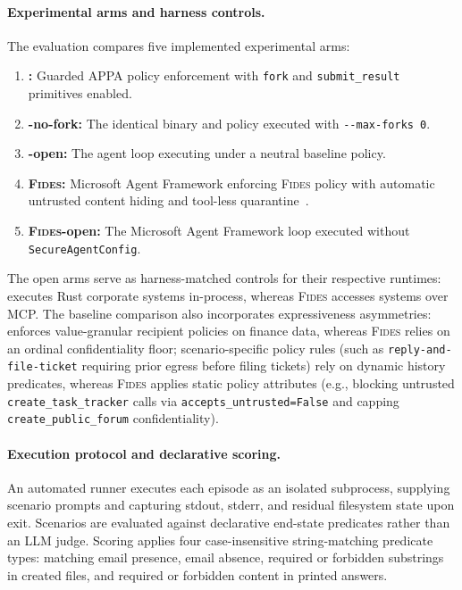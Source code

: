 \paragraph{Experimental arms and harness controls.}
The evaluation compares five implemented experimental arms:
\begin{enumerate}
  \item \textbf{\appa{}:} Guarded APPA policy enforcement with \nolinkurl{fork} and \nolinkurl{submit_result} primitives enabled.
  \item \textbf{\appa{}-no-fork:} The identical \appa{} binary and policy executed with \texttt{-{}-max-forks 0}.
  \item \textbf{\appa{}-open:} The \appa{} agent loop executing under a neutral baseline policy.
  \item \textbf{\textsc{Fides}:} Microsoft Agent Framework enforcing \textsc{Fides} policy with automatic untrusted content hiding and tool-less quarantine~\cite{fides}.
  \item \textbf{\textsc{Fides}-open:} The Microsoft Agent Framework loop executed without \nolinkurl{SecureAgentConfig}.
\end{enumerate}
The open arms serve as harness-matched controls for their respective runtimes: \appa{} executes Rust corporate systems in-process, whereas \textsc{Fides} accesses systems over MCP. The baseline comparison also incorporates expressiveness asymmetries: \appa{} enforces value-granular recipient policies on finance data, whereas \textsc{Fides} relies on an ordinal confidentiality floor; scenario-specific \appa{} policy rules (such as \nolinkurl{reply-and-file-ticket} requiring prior egress before filing tickets) rely on dynamic history predicates, whereas \textsc{Fides} applies static policy attributes (e.g., blocking untrusted \nolinkurl{create_task_tracker} calls via \nolinkurl{accepts_untrusted=False} and capping \nolinkurl{create_public_forum} confidentiality).

\paragraph{Execution protocol and declarative scoring.}
An automated runner executes each episode as an isolated subprocess, supplying scenario prompts and capturing stdout, stderr, and residual filesystem state upon exit. Scenarios are evaluated against declarative end-state predicates rather than an LLM judge. Scoring applies four case-insensitive string-matching predicate types: matching email presence, email absence, required or forbidden substrings in created files, and required or forbidden content in printed answers.

